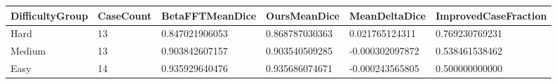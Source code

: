 \begin{tabular}{llllll}
\toprule
DifficultyGroup & CaseCount & BetaFFTMeanDice & OursMeanDice & MeanDeltaDice & ImprovedCaseFraction \\
\midrule
Hard & 13 & 0.847021906053 & 0.868787030363 & 0.021765124311 & 0.769230769231 \\
Medium & 13 & 0.903842607157 & 0.903540509285 & -0.000302097872 & 0.538461538462 \\
Easy & 14 & 0.935929640476 & 0.935686074671 & -0.000243565805 & 0.500000000000 \\
\bottomrule
\end{tabular}
